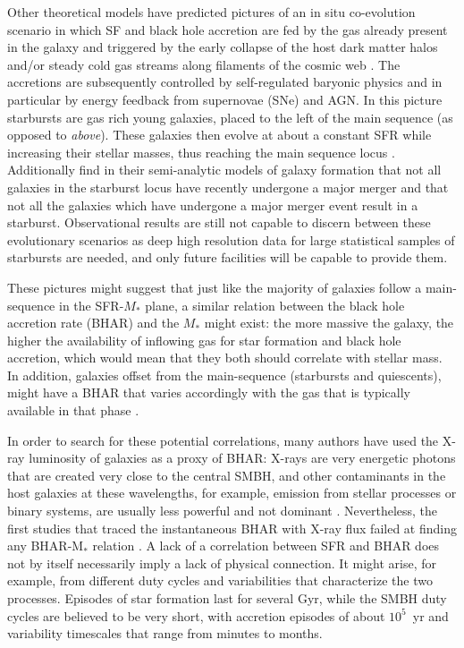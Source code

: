     Other theoretical models have predicted pictures of an in situ co-evolution scenario in which SF and black hole accretion are fed by the gas already present in the galaxy and triggered by the early collapse of the host dark matter halos  \citep[e.g.][]{2006ApJ...650...42L, 2011ApJ...742...24L, 2014ApJ...782...69L, 2013ApJ...772..119L,2015ApJ...810...74A, 2016ApJ...833..152M} and/or steady cold gas streams along filaments of the cosmic web  \citep[e.g.][]{2009Natur.457..451D, 2011ApJ...741L..33B}. The accretions are subsequently controlled by self-regulated baryonic physics and in particular by energy feedback from supernovae (SNe) and AGN. In this picture starbursts are gas rich young galaxies, placed to the left of the main sequence (as opposed to \textit{above}). These galaxies then evolve at about a constant SFR while increasing their stellar masses, thus reaching the main sequence locus \citep{2016ApJ...833..152M, 2018ApJ...857...22L}. Additionally \citet{2019MNRAS.482.4454W} find in their semi-analytic models of galaxy formation that not all galaxies in the starburst locus have recently undergone a major merger and that not all the galaxies which have undergone a major merger event result in a starburst.
    Observational results are still not capable to discern between these evolutionary scenarios as deep high resolution data for large statistical samples of starbursts are needed, and only future facilities will be capable to provide them. 
    
    These pictures might suggest that just like the majority of galaxies follow a main-sequence in the SFR-$M_*$ plane, a similar relation between the black hole accretion rate (BHAR) and the $M_*$ might exist: the more massive the galaxy, the higher the availability of inflowing gas for star formation and black hole accretion, which would mean that they both should correlate with stellar mass. In addition, galaxies offset from the main-sequence (starbursts and quiescents), might have a BHAR that varies accordingly with the gas that is typically available in that phase \citep{2019ApJ...877L..38R}. 
    
    In order to search for these potential correlations, many authors have used the X-ray luminosity of galaxies as a proxy of BHAR: X-rays are very energetic photons that are created very close to the central SMBH, and other contaminants in the host galaxies at these wavelengths, for example, emission from stellar processes or binary systems, are usually less powerful and not dominant \citep[e.g.][]{2015A&ARv..23....1B}. Nevertheless, the first studies that traced the instantaneous BHAR with X-ray flux failed at finding any BHAR-M$_*$ relation \citep{2009ApJ...696..396S, 2010A&A...518L..26S, 2012MNRAS.419...95M, 2012A&A...545A..45R, 2015ApJ...806..187A}. A lack of a correlation between SFR and BHAR does not by itself necessarily imply a lack of physical connection. It might arise, for example, from different duty cycles and variabilities that characterize the two processes.  
    Episodes of star formation last for several Gyr, while the SMBH duty cycles are believed to be very short, with accretion episodes of about $10^5$~yr and variability timescales that range from minutes to months.
    
